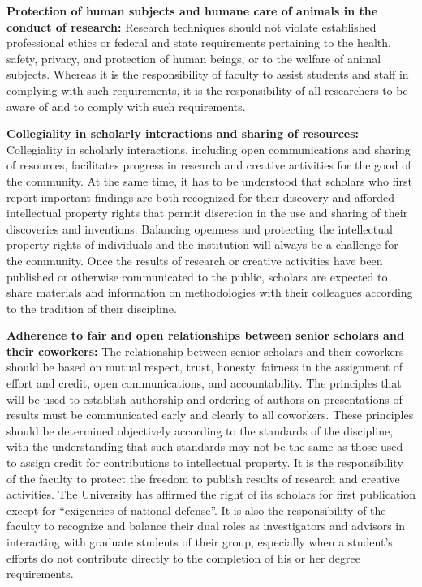 \textbf{Protection of human subjects and humane care of animals in the
  conduct of research:} Research techniques should not violate
established professional ethics or federal and state requirements
pertaining to the health, safety, privacy, and protection of human
beings, or to the welfare of animal subjects. Whereas it is the
responsibility of faculty to assist students and staff in complying
with such requirements, it is the responsibility of all researchers to
be aware of and to comply with such requirements. 

\textbf{Collegiality in scholarly interactions and sharing of
  resources:} Collegiality in scholarly interactions, including open
communications and sharing of resources, facilitates progress in
research and creative activities for the good of the community. At the
same time, it has to be understood that scholars who first report
important findings are both recognized for their discovery and
afforded intellectual property rights that permit discretion in the
use and sharing of their discoveries and inventions. Balancing
openness and protecting the intellectual property rights of
individuals and the institution will always be a challenge for the
community. Once the results of research or creative activities have
been published or otherwise communicated to the public, scholars are
expected to share materials and information on methodologies with
their colleagues according to the tradition of their discipline. 

\textbf{Adherence to fair and open relationships between senior
  scholars and their coworkers:} The relationship between senior
scholars and their coworkers should be based on mutual respect, trust,
honesty, fairness in the assignment of effort and credit, open
communications, and accountability. The principles that will be used
to establish authorship and ordering of authors on presentations of
results must be communicated early and clearly to all coworkers. These
principles should be determined objectively according to the standards
of the discipline, with the understanding that such standards may not
be the same as those used to assign credit for contributions to
intellectual property. It is the responsibility of the faculty to
protect the freedom to publish results of research and creative
activities. The University has affirmed the right of its scholars for
first publication except for “exigencies of national defense”. It is
also the responsibility of the faculty to recognize and balance their
dual roles as investigators and advisors in interacting with graduate
students of their group, especially when a student’s efforts do not
contribute directly to the completion of his or her degree
requirements. 

